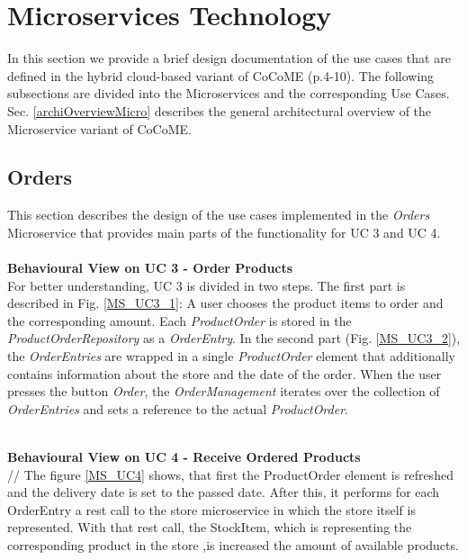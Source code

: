 	

	
\section{Microservices Technology} \label{MS}
	In this section we provide a brief design documentation of the use cases that are defined in the hybrid cloud-based variant of CoCoME \cite{herold2008}(p.4-10).
	The following subsections are divided into the Microservices and the corresponding Use Cases. Sec. \ref{archiOverviewMicro} describes the general architectural overview of the Microservice variant of CoCoME.
	

	

	\FloatBarrier
		\subsection{Orders}
		This section describes the design of the use cases implemented in the \textit{Orders} Microservice that provides main parts of the functionality for UC 3 and UC 4.\\
		\noindent
		\\
		\textbf{Behavioural View on UC 3 - Order Products} \\
		For better understanding, UC 3 is divided in two steps. The first part is described in Fig. \ref{MS_UC3_1}: A user chooses the product items to order and the corresponding amount. Each \textit{ProductOrder} is stored in the \textit{ProductOrderRepository} as a \textit{OrderEntry}. In the second part (Fig. \ref{MS_UC3_2}), the  \textit{OrderEntries} are wrapped in a single \textit{ProductOrder} element that additionally contains information about the store and the date of the order. When the user presses the button \textit{Order}, the \textit{OrderManagement} iterates over the collection of \textit{OrderEntries} and sets a reference to the actual \textit{ProductOrder}.
	
		\noindent
		\\
		\textbf{Behavioural View on UC 4 - Receive Ordered Products} \\
		//%
		The figure \ref{MS_UC4} shows, that first the ProductOrder element is refreshed and the delivery date is set to the passed date.
		After this, it performs for each OrderEntry a rest call to the store microservice in which the store itself is represented. With that rest call, the StockItem, which is representing the corresponding product in the store ,is increased the amount of available products.
		
